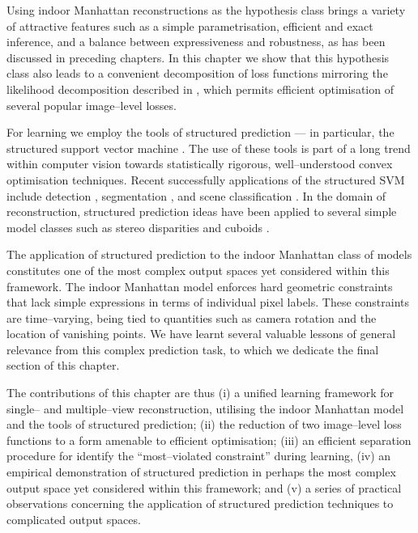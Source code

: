 Using indoor Manhattan reconstructions as the hypothesis class brings
a variety of attractive features such as a simple parametrisation,
efficient and exact inference, and a balance between expressiveness
and robustness, as has been discussed in preceding chapters. In this
chapter we show that this hypothesis class also leads to a convenient
decomposition of loss functions mirroring the likelihood decomposition
described in , which permits efficient optimisation of
several popular image--level losses.

For learning we employ the tools of structured prediction --- in
particular, the structured support vector machine
\cite{Tsochantaridis04}. The use of these tools is part of a long
trend within computer vision towards statistically rigorous,
well--understood convex optimisation techniques. Recent successfully
applications of the structured SVM include detection
\cite{blaschko2008learning}, segmentation
\cite{Szummer2008,taskar2004max}, and scene classification
\cite{Yang2010}\changedsinceviva. In the domain of reconstruction,
structured prediction ideas have been applied to several simple model
classes such as stereo disparities \cite{li2008learning} and cuboids
\cite{Hedau09}.

The application of structured prediction to the indoor Manhattan class
of models constitutes one of the most complex output spaces yet
considered within this framework. The indoor Manhattan model enforces
hard geometric constraints that lack simple expressions in terms of
individual pixel labels. These constraints are time--varying,
being tied to quantities such as camera rotation and the location of
vanishing points. We have learnt several valuable lessons of general
relevance from this complex prediction task, to which we dedicate the
final section of this chapter.

The contributions of this chapter are thus (i) a unified learning
framework for single-- and multiple--view reconstruction, utilising
the indoor Manhattan model and the tools of structured prediction;
(ii) the reduction of two image--level loss functions to a form
amenable to efficient optimisation; (iii) an efficient separation
procedure for identify the ``most--violated constraint'' during
learning, (iv) an empirical demonstration of structured prediction in
perhaps the most complex output space yet considered within this
framework; and (v) a series of practical observations concerning the
application of structured prediction techniques to complicated output
spaces.

